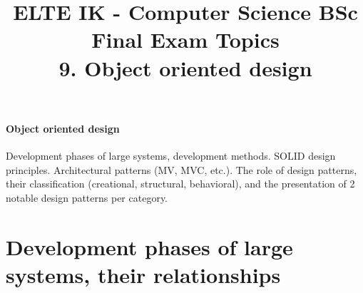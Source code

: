 \documentclass[margin=0px]{article}
\title{\textbf{{\Large ELTE IK - Computer Science BSc} \vspace{0.2cm} \\ {\huge Final Exam Topics}} \vspace{0.3cm} \\ 9. Object oriented design}
\author{}
\date{}
\newenvironment{tetel}[1]{\paragraph{#1 \\}}{}
\begin{document}
\maketitle

\begin{center}
\end{center}

\begin{tetel}{Object oriented design}
    Development phases of large systems, development methods. SOLID design principles. Architectural patterns (MV, MVC, etc.). The role of design patterns, their classification (creational, structural, behavioral), and the presentation of 2 notable design patterns per category.
\end{tetel}

\section{Development phases of large systems, their relationships}
\end{document}
